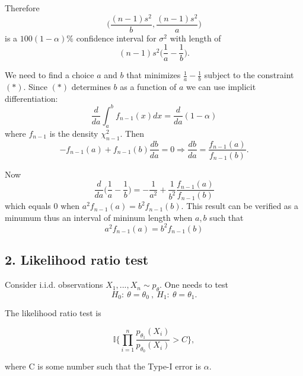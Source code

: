 \documentclass{tufte-book}
\begin{document}
\begin{enumerate}
Therefore
\[ \Big( \frac{(n-1)s^2}{b}, \frac{(n-1)s^2}{a} \Big)\]
is a $100(1-\alpha)\%$ confidence interval for $\sigma^2$ with length of \[(n-1)s^2\big(\frac{1}{a} - \frac{1}{b}\big).\]

We need to find a choice $a$ and $b$ that minimizes $\frac{1}{a} - \frac{1}{b}$ subject to the constraint $(*)$. Since $(*)$ determines $b$ as a function of $a$ we can use implicit differentiation:
\[ \frac{d}{da} \int_{a}^{b} f_{n-1}(x)dx = \frac{d}{da}(1-\alpha)\]
where $f_{n-1}$ is the density $\chi_{n-1}^2$.   Then
\[ -f_{n-1}(a) + f_{n-1}(b)\frac{db}{da} = 0 \Rightarrow \frac{db}{da}= \frac{f_{n-1}(a)}{f_{n-1}(b)}. \]

Now
\[ \frac{d}{da}\big(\frac{1}{a} - \frac{1}{b}\big) = -\frac{1}{a^2} + \frac{1}{b^2}\frac{f_{n-1}(a)}{f_{n-1}(b)}\]
which equals $0$ when $a^2f_{n-1}(a) = b^2f_{n-1}(b)$.  This result can be verified as a minumum thus an interval of mininum length when $a,b$ such that
\[ a^2f_{n-1}(a) = b^2f_{n-1}(b) \]
\end{enumerate}

\subsection{2. Likelihood ratio test}
Consider i.i.d. observations $X_1,...,X_n \sim p_{\theta}$.  One needs to test
\[ H_0  : \ \theta = \theta_0 \ , \ H_1  : \ \theta=\theta_1. \]

The likelihood ratio test is

\[ \mathbb{I}\Big\{\prod_{i=1}^n \frac{p_{\theta_1}(X_i)}{p_{\theta_0}(X_i)} > C \Big\}, \]

where C is some number such that the Type-I error is $\alpha$.
\end{document}
